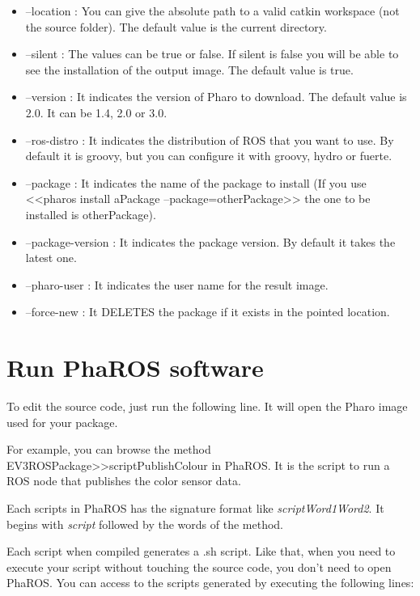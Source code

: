 \documentclass[a4paper,10pt,twoside]{book}
\begin{document}
\begin{itemize}
          \item --location : You can give the absolute path to a valid catkin workspace (not the source folder). The default value is the current directory.
          \item --silent : The values can be true or false. If silent is false you will be able to see the installation of the output image. The default value is true. 
          \item --version : It indicates the version of Pharo to download. The default value is 2.0. It can be 1.4, 2.0 or 3.0.
          \item --ros-distro : It indicates the distribution of ROS that you want to use. By default it is groovy, but you can configure it with groovy, hydro or fuerte.
          \item --package : It indicates the name of the package to install (If you use <<pharos install aPackage --package=otherPackage>> the one to be installed is otherPackage).
          \item --package-version : It indicates the package version. By default it takes the latest one.
          \item --pharo-user : It indicates the user name for the result image.
          \item --force-new : It DELETES the package if it exists in the pointed location.
\end{itemize}

\section{Run PhaROS software}

To edit the source code, just run the following line. It will open the Pharo image used for your package.


For example, you can browse the method EV3ROSPackage>>scriptPublishColour in PhaROS. It is the script to run a ROS node that publishes the color sensor data.

Each scripts in PhaROS has the signature format like \emph{scriptWord1Word2}. It begins with \emph{script} followed by the words of the method.

Each script when compiled generates a .sh script. Like that, when you need to execute your script without touching the source code, you don't need to open PhaROS. You can access to the scripts generated by executing the following lines:
\end{document}
